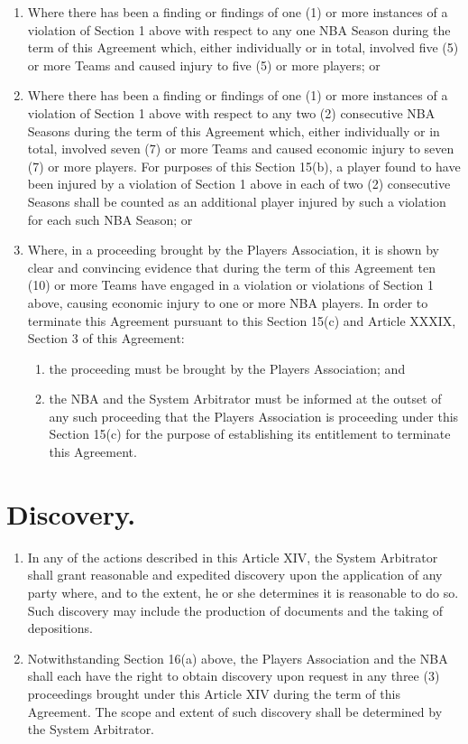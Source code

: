 \documentclass[
]{book}
\providecommand{\tightlist}{%
  \setlength{\itemsep}{0pt}\setlength{\parskip}{0pt}}
\begin{document}
\begin{enumerate}
\def\labelenumi{(\alph{enumi})}
\tightlist
\item
  Where there has been a finding or findings of one (1) or more instances of a violation of Section 1 above with respect to any one NBA Season during the term of this Agreement which, either individually or in total, involved five (5) or more Teams and caused injury to five (5) or more players; or
\item
  Where there has been a finding or findings of one (1) or more instances of a violation of Section 1 above with respect to any two (2) consecutive NBA Seasons during the term of this Agreement which, either individually or in total, involved seven (7) or more Teams and caused economic injury to seven (7) or more players. For purposes of this Section 15(b), a player found to have been injured by a violation of Section 1 above in each of two (2) consecutive Seasons shall be counted as an additional player injured by such a violation for each such NBA Season; or
\item
  Where, in a proceeding brought by the Players Association, it is shown by clear and convincing evidence that during the term of this Agreement ten (10) or more Teams have engaged in a violation or violations of Section 1 above, causing economic injury to one or more NBA players. In order to terminate this Agreement pursuant to this Section 15(c) and Article XXXIX, Section 3 of this Agreement:

  \begin{enumerate}
  \def\labelenumii{(\roman{enumii})}
  \tightlist
  \item
    the proceeding must be brought by the Players Association; and
  \item
    the NBA and the System Arbitrator must be informed at the outset of any such proceeding that the Players Association is proceeding under this Section 15(c) for the purpose of establishing its entitlement to terminate this Agreement.
  \end{enumerate}
\end{enumerate}

\hypertarget{discovery.}{%
\section{Discovery.}\label{discovery.}}

\begin{enumerate}
\def\labelenumi{(\alph{enumi})}
\tightlist
\item
  In any of the actions described in this Article XIV, the System Arbitrator shall grant reasonable and expedited discovery upon the application of any party where, and to the extent, he or she determines it is reasonable to do so. Such discovery may include the production of documents and the taking of depositions.
\item
  Notwithstanding Section 16(a) above, the Players Association and the NBA shall each have the right to obtain discovery upon request in any three (3) proceedings brought under this Article XIV during the term of this Agreement. The scope and extent of such discovery shall be determined by the System Arbitrator.
\end{enumerate}
\end{document}
